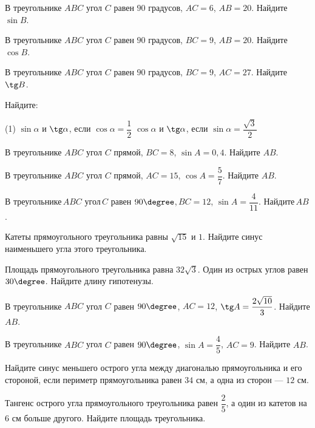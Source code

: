 %
%

\begin{class}[number=1]
	\begin{listofex}
		\item В треугольнике \( ABC \) угол \( C \) равен \( 90 \) градусов, \( AC=6 \), \( AB=20 \). Найдите \( \sin B \).
		\item  В треугольнике \( ABC \) угол \( C \) равен \( 90 \) градусов, \( BC=9 \), \( AB=20 \). Найдите \( \cos B \).
		\item В треугольнике \( ABC \) угол \( C \) равен \( 90 \) градусов, \( BC=9 \), \( AC=27 \). Найдите \( \tg B \).
		\item Найдите:
		\begin{tasks}(1)
			\task \( \sin\alpha \) и \( \tg\alpha \), если \( \cos\alpha=\dfrac{1}{2} \)
			\task \( \cos\alpha \) и \( \tg\alpha \), если \( \sin\alpha=\dfrac{\sqrt{3}}{2} \)
		\end{tasks}
		\item В треугольнике \( ABC \) угол \( C \) прямой, \( BC=8 \), \( \sin A=0,4 \). Найдите \( AB \).
		\item В треугольнике \( ABC \) угол \( C \) прямой, \( AC=15 \), \( \cos A=\dfrac{5}{7} \). Найдите \( AB \).
		\item В треугольнике \( ABC \) угол \( C \) равен \( 90\degree \), \( BC=12 \), \( \sin A=\dfrac{4}{11} \). Найдите \( AB \).
		\item Катеты прямоугольного треугольника равны \( \sqrt{15} \) и \( 1 \). Найдите синус наименьшего угла этого треугольника.
		\item Площадь прямоугольного треугольника равна \( 32\sqrt{3} \). Один из острых углов равен \( 30\degree \). Найдите длину гипотенузы.
		\item В треугольнике \( ABC \) угол \( C \) равен \( 90\degree \), \( AC=12 \), \( \tg A=\dfrac{2\sqrt{10}}{3} \).  Найдите \( AB \).
		\item В треугольнике \( ABC \) угол \( C \) равен \( 90\degree \), \( \sin A=\dfrac{4}{5} \), \( AC=9 \). Найдите \( AB \).
		\item Найдите синус меньшего острого угла между	диагональю прямоугольника и его стороной, если периметр прямоугольника равен \( 34 \) см, а одна из сторон --- \( 12 \) см. 
		\item Тангенс острого угла прямоугольного треугольника равен \( \dfrac{2}{5} \), а один из катетов на \( 6 \) см больше другого. Найдите площадь треугольника. 

\end{listofex}
\end{class}
